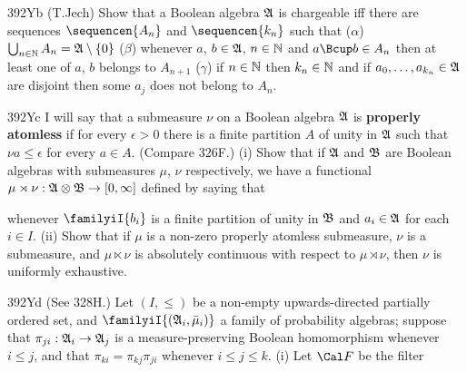 {\spheader 392Yb (T.Jech)
Show that a Boolean algebra $\frak A$ is chargeable
iff there are sequences $\sequencen{A_n}$ and
$\sequencen{k_n}$ such that
($\alpha$) $\bigcup_{n\in\Bbb N}A_n=\frak A\setminus\{0\}$
($\beta$) whenever $a$, $b\in\frak A$, $n\in\Bbb N$
and $a\Bcup b\in A_n$ then at least
one of $a$, $b$ belongs to $A_{n+1}$ ($\gamma$) if $n\in\Bbb N$ then
$k_n\in\Bbb N$ and if $a_0,\ldots,a_{k_n}\in\frak A$ are disjoint
then some $a_j$ does not belong to $A_n$.

\spheader 392Yc I will say that a submeasure $\nu$ on a Boolean algebra
$\frak A$ is {\bf properly atomless} if for every $\epsilon>0$ there is a
finite partition $A$ of unity in $\frak A$ such that $\nu a\le\epsilon$ for
every $a\in A$.   (Compare 326F.)
(i) Show that if $\frak A$ and $\frak B$ are Boolean algebras
with submeasures $\mu$, $\nu$ respectively, we have a functional
$\mu\rtimes\nu:\frak A\otimes\frak B\to[0,\infty]$ defined by saying that


\noindent whenever $\familyiI{b_i}$ is a finite partition of unity in
$\frak B$ and $a_i\in\frak A$ for each $i\in I$.   (ii) Show that if
$\mu$ is a non-zero properly atomless submeasure,
$\nu$ is a submeasure, and
$\mu\ltimes\nu$ is absolutely continuous with respect to $\mu\rtimes\nu$,
then $\nu$ is uniformly exhaustive.

\spheader 392Yd (See 328H.)
Let $(I,\le)$ be a non-empty upwards-directed partially
ordered set, and $\familyiI{(\frak A_i,\bar\mu_i)}$
a family of probability algebras;  suppose
that $\pi_{ji}:\frak A_i\to\frak A_j$ is a measure-preserving
Boolean homomorphism whenever $i\le j$, and that
$\pi_{ki}=\pi_{kj}\pi_{ji}$ whenever $i\le j\le k$.
(i) Let $\Cal F$ be the filter


}
